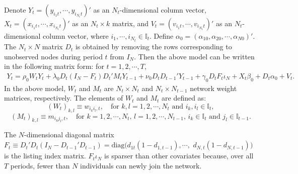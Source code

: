 \documentclass[11pt,a4paper]{article}
\begin{document}
Denote $Y_t=(y_{i_1t},\cdots,y_{i_{N_t}t})'$ as an $N_t$-dimensional column vector, $X_t=(x_{i_1t},\cdots,x_{i_{N_t}t})'$ as an $N_t\times k$ matrix, and $V_t=(v_{i_1t},\cdots,v_{i_{N_t}t})'$ as an $N_t$-dimensional column vector, where $i_1,\cdots,i_{N_t}\in\mathbb{I}_t$.
Define $\alpha_0=(\alpha_{10},\alpha_{20},\cdots,\alpha_{N0})'$. The $N_t\times N$ matrix $D_t$ is obtained by removing the rows corresponding to unobserved nodes during period $t$ from $I_N$.
Then the above model can be written in the following matrix form: for $t=1,2,\cdots,T$,
\begin{align}\label{model_m}
Y_t=\rho_0 W_tY_t+\lambda_0 D_t(I_N-F_t)D_t'M_tY_{t-1}+\nu_0 D_tD_{t-1}'Y_{t-1}+\gamma_0 D_t F_t\iota_N+X_t\beta_0+D_t\alpha_0+V_t.
\end{align}
In the above model, $W_t$ and $M_t$ are $N_t \times N_t$ and $N_t \times N_{t-1}$ network weight matrices, respectively. The elements of $W_t$ and $M_t$ are defined as:  
$$
(W_t)_{k,l} \equiv w_{i_ki_l,t}, \quad \text{for } k,l=1,2,\cdots,N_t \text{ and } i_k,i_l\in\mathbb{I}_t,
$$  
$$
(M_t)_{k,l} \equiv m_{i_kj_l,t}, \quad \text{for } k=1,2,\cdots,N_t\text{, }l=1,2,\cdots,N_{t-1}\text{, }  i_k\in\mathbb{I}_t\text{ and } j_l\in\mathbb{I}_{t-1}.
$$  


The $N$-dimensional diagonal matrix $F_t\equiv D_t'D_t(I_N-D_{t-1}'D_{t-1})=\mathrm{diag}(d_{1t}(1-d_{1,t-1}),\cdots,$ $d_{N,t}(1-d_{N,t-1}))$ is the listing index matrix. $F_t\iota_N$ is sparser than other covariates because, over all $T$ periods, fewer than $N$ individuals can newly join the network.
\end{document}
